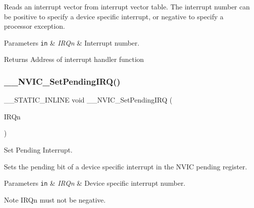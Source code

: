 Reads an interrupt vector from interrupt vector table. The interrupt number can be positive to specify a device specific interrupt, or negative to specify a processor exception. 
\begin{DoxyParams}[1]{Parameters}
\mbox{\tt in}  & {\em I\+R\+Qn} & Interrupt number. \\
\hline
\end{DoxyParams}
\begin{DoxyReturn}{Returns}
Address of interrupt handler function 
\end{DoxyReturn}
\mbox{\label{group___c_m_s_i_s___core___n_v_i_c_functions_gaabefdd4b790b9a7308929938c0c1e1ad}} 
\subsubsection{\texorpdfstring{\+\_\+\+\_\+\+N\+V\+I\+C\+\_\+\+Set\+Pending\+I\+R\+Q()}{\_\_NVIC\_SetPendingIRQ()}}
{\footnotesize\ttfamily \+\_\+\+\_\+\+S\+T\+A\+T\+I\+C\+\_\+\+I\+N\+L\+I\+NE void \+\_\+\+\_\+\+N\+V\+I\+C\+\_\+\+Set\+Pending\+I\+RQ (\begin{DoxyParamCaption}\item[{\hyperlink{group___peripheral__interrupt__number__definition_ga7e1129cd8a196f4284d41db3e82ad5c8}{I\+R\+Qn\+\_\+\+Type}}]{I\+R\+Qn }\end{DoxyParamCaption})}



Set Pending Interrupt. 

Sets the pending bit of a device specific interrupt in the N\+V\+IC pending register. 
\begin{DoxyParams}[1]{Parameters}
\mbox{\tt in}  & {\em I\+R\+Qn} & Device specific interrupt number. \\
\hline
\end{DoxyParams}
\begin{DoxyNote}{Note}
I\+R\+Qn must not be negative. 
\end{DoxyNote}
\mbox{\label{group___c_m_s_i_s___core___n_v_i_c_functions_ga505338e23563a9c074910fb14e7d45fd}} 

